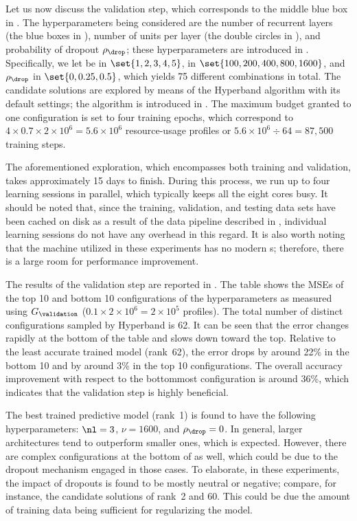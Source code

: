 Let us now discuss the validation step, which corresponds to the middle blue box
in . The hyperparameters being considered are the number of
recurrent layers \nl (the blue boxes in ), number
of units per layer \nu (the double circles in ),
and probability of dropout $\rho_\drop$; these hyperparameters are introduced in
. Specifically, we let \nl be in $\set{1, 2, 3, 4,
5}$, \nu in $\set{100, 200, 400, 800, 1600}$, and $\rho_\drop$ in $\set{0, 0.25,
0.5}$, which yields 75 different combinations in total. The candidate solutions
are explored by means of the Hyperband algorithm with its default settings; the
algorithm is introduced in . The maximum budget
granted to one configuration is set to four training epochs, which correspond to
$4 \times 0.7 \times 2 \times 10^6 = 5.6 \times 10^6$ resource-usage profiles or
$5.6 \times 10^6 \div 64 = 87{,}500$ training steps.

The aforementioned exploration, which encompasses both training and validation,
takes approximately 15 days to finish. During this process, we run up to four
learning sessions in parallel, which typically keeps all the eight cores busy.
It should be noted that, since the training, validation, and testing data sets
have been cached on disk as a result of the data pipeline described in
, individual learning sessions do not have any
overhead in this regard. It is also worth noting that the machine utilized in
these experiments has no modern s; therefore, there is a large room for
performance improvement.

The results of the validation step are reported in . The
table shows the \acp{MSE} of the top 10 and bottom 10 configurations of the
hyperparameters as measured using $G_\validation$ ($0.1 \times 2 \times 10^6 = 2
\times 10^5$ profiles). The total number of distinct configurations sampled by
Hyperband is 62. It can be seen that the error changes rapidly at the bottom of
the table and slows down toward the top. Relative to the least accurate trained
model (rank~62), the error drops by around 22\% in the bottom 10 and by around
3\% in the top 10 configurations. The overall accuracy improvement with respect
to the bottommost configuration is around 36\%, which indicates that the
validation step is highly beneficial.

The best trained predictive model (rank~1) is found to have the following
hyperparameters: $\nl = 3$, $\nu = 1600$, and $\rho_\drop = 0$. In general,
larger architectures tend to outperform smaller ones, which is expected.
However, there are complex configurations at the bottom of
 as well, which could be due to the dropout mechanism
engaged in those cases. To elaborate, in these experiments, the impact of
dropouts is found to be mostly neutral or negative; compare, for instance, the
candidate solutions of rank~2 and 60. This could be due the amount of training
data being sufficient for regularizing the model.

